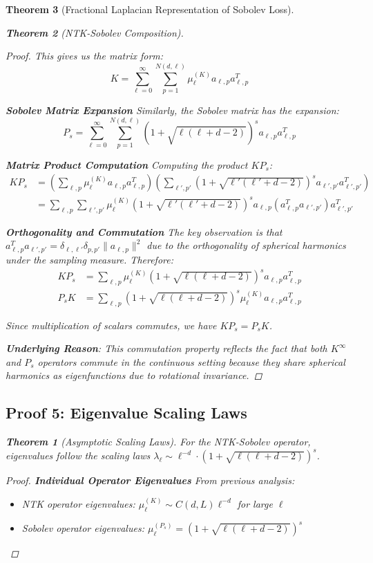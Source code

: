 \documentclass{article}
\newtheorem{theorem}{Theorem}[section]
\begin{document}
\begin{theorem}[Fractional Laplacian Representation of Sobolev Loss]
\begin{theorem}[NTK-Sobolev Composition]
\begin{proof}
This gives us the matrix form:
\[ K = \sum_{\ell=0}^{\infty} \sum_{p=1}^{N(d,\ell)} \mu_\ell^{(K)} a_{\ell,p} a_{\ell,p}^T \]

\textbf{Sobolev Matrix Expansion}
Similarly, the Sobolev matrix has the expansion:
\[ P_s = \sum_{\ell=0}^{\infty} \sum_{p=1}^{N(d,\ell)} (1 + \sqrt{\ell(\ell + d - 2)})^s a_{\ell,p} a_{\ell,p}^T \]

\textbf{Matrix Product Computation}
Computing the product $KP_s$:
\begin{align}
KP_s &= \left(\sum_{\ell,p} \mu_\ell^{(K)} a_{\ell,p} a_{\ell,p}^T\right) \left(\sum_{\ell',p'} (1 + \sqrt{\ell'(\ell' + d - 2)})^s a_{\ell',p'} a_{\ell',p'}^T\right) \\
&= \sum_{\ell,p} \sum_{\ell',p'} \mu_\ell^{(K)} (1 + \sqrt{\ell'(\ell' + d - 2)})^s a_{\ell,p} (a_{\ell,p}^T a_{\ell',p'}) a_{\ell',p'}^T
\end{align}

\textbf{Orthogonality and Commutation}
The key observation is that $a_{\ell,p}^T a_{\ell',p'} = \delta_{\ell,\ell'} \delta_{p,p'} \|a_{\ell,p}\|^2$ due to the orthogonality of spherical harmonics under the sampling measure. Therefore:
\begin{align}
KP_s &= \sum_{\ell,p} \mu_\ell^{(K)} (1 + \sqrt{\ell(\ell + d - 2)})^s a_{\ell,p} a_{\ell,p}^T \\
P_sK &= \sum_{\ell,p} (1 + \sqrt{\ell(\ell + d - 2)})^s \mu_\ell^{(K)} a_{\ell,p} a_{\ell,p}^T
\end{align}

Since multiplication of scalars commutes, we have $KP_s = P_sK$.

\textbf{Underlying Reason}: This commutation property reflects the fact that both $K^{\infty}$ and $P_s$ operators commute in the continuous setting because they share spherical harmonics as eigenfunctions due to rotational invariance.
\end{proof}

\subsection{Proof 5: Eigenvalue Scaling Laws}

\begin{theorem}[Asymptotic Scaling Laws]
For the NTK-Sobolev operator, eigenvalues follow the scaling laws $\lambda_\ell \sim \ell^{-d} \cdot (1 + \sqrt{\ell(\ell + d - 2)})^s$.
\end{theorem}

\begin{proof}
\textbf{Individual Operator Eigenvalues}
From previous analysis:
\begin{itemize}
\item NTK operator eigenvalues: $\mu_\ell^{(K)} \sim C(d, L) \ell^{-d}$ for large $\ell$
\item Sobolev operator eigenvalues: $\mu_\ell^{(P_s)} = (1 + \sqrt{\ell(\ell + d - 2)})^s$
\end{itemize}


\end{proof}
\end{theorem}
\end{theorem}
\end{document}
